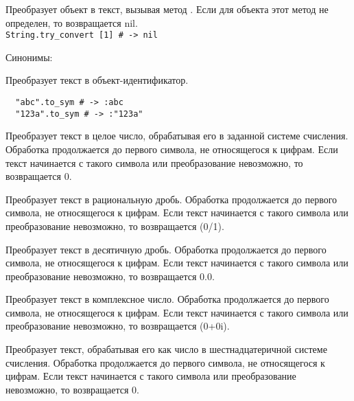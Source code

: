 \begin{methodlist}
  Преобразует объект в текст, вызывая метод . Если для объекта этот метод не определен, то возвращается nil.
  \\\verb!String.try_convert [1] # -> nil!

  Синонимы: 

  Преобразует текст в объект-идентификатор.
  \begin{verbatim}
  "abc".to_sym # -> :abc
  "123a".to_sym # -> :"123a"
  \end{verbatim}  

  Преобразует текст в целое число, обрабатывая его в заданной системе счисления. Обработка продолжается до первого символа, не относящегося к цифрам. Если текст начинается с такого символа или преобразование невозможно, то возвращается 0.

  Преобразует текст в рациональную дробь. Обработка продолжается до первого символа, не относящегося к цифрам. Если текст начинается с такого символа или преобразование невозможно, то возвращается (0/1). 

  Преобразует текст в десятичную дробь. Обработка продолжается до первого символа, не относящегося к цифрам. Если текст начинается с такого символа или преобразование невозможно, то возвращается 0.0. 

  Преобразует текст в комплексное число. Обработка продолжается до первого символа, не относящегося к цифрам. Если текст начинается с такого символа или преобразование невозможно, то возвращается (0+0i).

  Преобразует текст, обрабатывая его как число в шестнадцатеричной системе счисления. Обработка продолжается до первого символа, не относящегося к цифрам. Если текст начинается с такого символа или преобразование невозможно, то возвращается 0.


\end{methodlist}
